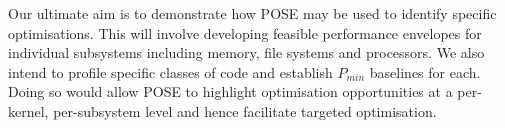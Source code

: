 Our ultimate aim is to demonstrate how POSE may be used to identify specific optimisations.
This will involve developing feasible performance envelopes for individual subsystems including memory, file systems and processors. 
We also intend to profile specific classes of code and establish $P_{min}$ baselines for each.
Doing so would allow POSE to highlight optimisation opportunities at a per-kernel, per-subsystem level and hence facilitate targeted optimisation.
